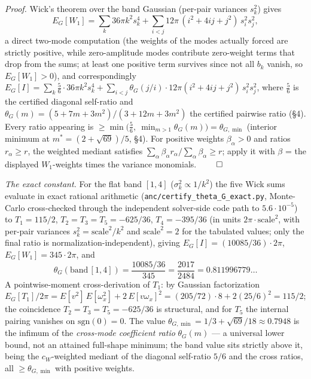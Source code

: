 \documentclass[11pt]{article}
\theoremstyle{remark}
\theoremstyle{plain}
\begin{document}
\emph{Proof.} Wick's theorem over the band Gaussian (per-pair variances $s_k^2$) gives
\begin{equation*}
  E_G[W_1] = \sum_{k} 36\pi k^2 s_k^4
  + \sum_{i<j} 12\pi\,(i^2 + 4ij + j^2)\, s_i^2 s_j^2,
\end{equation*}
a direct two-mode computation (the weights of the modes actually forced are strictly
positive, while zero-amplitude modes contribute zero-weight terms that drop from the
sums; at least one positive term survives since not all $b_k$ vanish, so
$E_G[W_1] > 0$), and correspondingly
$E_G[I] = \sum_k \tfrac56\cdot 36\pi k^2 s_k^4 + \sum_{i<j} \theta_G(j/i)\cdot
12\pi(i^2+4ij+j^2)\, s_i^2 s_j^2$, where $\tfrac56$ is the certified diagonal
self-ratio and $\theta_G(m) = (5+7m+3m^2)/(3+12m+3m^2)$ the certified pairwise ratio
(\S4). Every ratio appearing is $\ge \min\bigl(\tfrac56,\ \min_{m>1}\theta_G(m)\bigr)
= \theta_{G,\min}$ (interior minimum at $m^* = (2+\sqrt{69})/5$, \S4). For positive
weights $\beta_\alpha > 0$ and ratios $r_\alpha \ge r$, the weighted mediant satisfies
$\sum_\alpha \beta_\alpha r_\alpha / \sum_\alpha \beta_\alpha \ge r$; apply it with
$\beta$ = the displayed $W_1$-weights times the variance monomials. $\qed$

\emph{The exact constant.} For the flat band $[1,4]$ ($\sigma_k^2 \propto 1/k^2$) the five Wick sums
evaluate in exact rational arithmetic (\texttt{anc/certify\_theta\_G\_exact.py}, Monte-Carlo
cross-checked through the independent solver-side code path to $5.6\cdot10^{-5}$) to $T_1 = 115/2$,
$T_2 = T_3 = T_5 = -625/36$, $T_4 = -395/36$ (in units $2\pi\cdot\text{scale}^2$, with per-pair
variances $s_k^2 = \text{scale}^2/k^2$ and $\text{scale}^2 = 2$ for the tabulated values; only the
final ratio is normalization-independent), giving
$E_G[I] = (10085/36)\cdot 2\pi$, $E_G[W_1] = 345\cdot 2\pi$, and
\begin{equation}
  \theta_G(\text{band}\,[1,4]) = \frac{10085/36}{345} = \frac{2017}{2484} = 0.811996779\ldots
\end{equation}
A pointwise-moment cross-derivation of $T_1$: by Gaussian factorization
$E_G[T_1]/2\pi = E[v^2]\,E[\omega_x^2] + 2\,E[v\omega_x]^2 = (205/72)\cdot 8 + 2(25/6)^2 = 115/2$; the
coincidence $T_2 = T_3 = T_5 = -625/36$ is structural, and for $T_5$ the internal pairing vanishes on
$\mathrm{sgn}(0)=0$. The value $\theta_{G,\min} = 1/3 + \sqrt{69}/18 \approx 0.7948$
is the infimum of the \emph{cross-mode coefficient ratio} $\theta_G(m)$ --- a universal lower bound,
not an attained full-shape minimum; the band value sits strictly above it, being the $c_W$-weighted mediant
of the diagonal self-ratio $5/6$ and the cross ratios, all $\ge \theta_{G,\min}$ with positive
weights.
\end{document}
